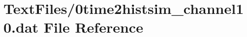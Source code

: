 \hypertarget{0time2histsim__channel10_8dat}{}\section{Text\+Files/0time2histsim\+\_\+channel10.dat File Reference}
\label{0time2histsim__channel10_8dat}
